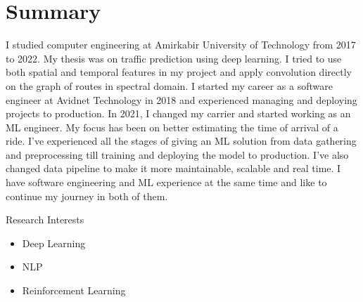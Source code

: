 \section{Summary}\closesection{}

I studied computer engineering at Amirkabir University of Technology from 2017 to 2022.
My thesis was on traffic prediction using deep learning.
I tried to use both spatial and temporal features in my project and apply
convolution directly on the graph of routes in spectral domain.
I started my career as a software engineer at Avidnet Technology in 2018 and experienced managing
and deploying projects to production.
In 2021, I changed my carrier and started working as an ML engineer.
My focus has been on better estimating the time of arrival of a ride.
I've experienced all the stages of giving an ML solution from data gathering and preprocessing
till training and deploying the model to production.
I've also changed data pipeline to make it more maintainable, scalable and real time.
I have software engineering and ML experience at the same time and like to continue my journey in both of them.

\cventry
{}
{Research Interests}
{}
{}
{}
{}
\begin{itemize}
  \item Deep Learning
  \item NLP
  \item Reinforcement Learning
\end{itemize}
